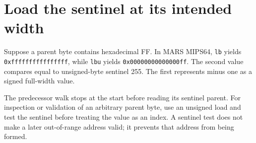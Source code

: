 \section{Load the sentinel at its intended width}\label{maze-x-signed-byte}
Suppose a parent byte contains hexadecimal FF. In MARS MIPS64,
\texttt{lb} yields \texttt{0xffffffffffffffff}, while \texttt{lbu} yields
\texttt{0x00000000000000ff}. The second value compares equal to unsigned-byte sentinel 255.
The first represents minus one as a signed full-width value.

The predecessor walk stops at the start before reading its sentinel parent.
For inspection or validation of an arbitrary parent byte, use an unsigned load and
test the sentinel before treating the value as an index. A sentinel test does not
make a later out-of-range address valid; it prevents that address from being formed.
